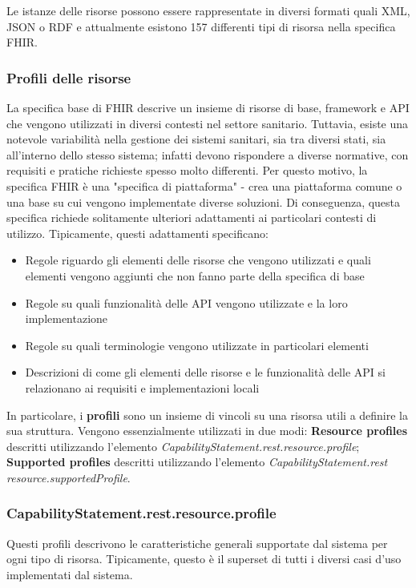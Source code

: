 \documentclass[a4paper]{article}
\begin{document}
Le istanze delle risorse possono essere rappresentate in diversi formati quali XML, JSON o RDF e attualmente esistono 157 differenti tipi di risorsa nella specifica FHIR.

\subsubsection*{Profili delle risorse}
La specifica base di FHIR descrive un insieme di risorse di base, framework e API che vengono utilizzati in diversi contesti nel settore sanitario. Tuttavia, esiste una notevole variabilità nella gestione dei sistemi sanitari, sia tra diversi stati, sia all'interno dello stesso sistema; infatti devono rispondere a diverse normative, con requisiti e pratiche richieste spesso molto differenti.
Per questo motivo, la specifica FHIR è una "specifica di piattaforma" - crea una piattaforma comune o una base su cui vengono implementate diverse soluzioni. Di conseguenza, questa specifica richiede solitamente ulteriori adattamenti ai particolari contesti di utilizzo. Tipicamente, questi adattamenti specificano:
\begin{itemize}
    \item Regole riguardo gli elementi delle risorse che vengono utilizzati e quali elementi vengono aggiunti che non fanno parte della specifica di base
    \item Regole su quali funzionalità delle API vengono utilizzate e la loro implementazione
    \item Regole su quali terminologie vengono utilizzate in particolari elementi
    \item Descrizioni di come gli elementi delle risorse e le funzionalità delle API si  relazionano ai requisiti e implementazioni locali
\end{itemize}
In particolare, i \textbf{profili} sono un insieme di vincoli su una risorsa utili a definire la sua struttura.
Vengono essenzialmente utilizzati in due modi:
\textbf{Resource profiles} descritti utilizzando l'elemento \textit{CapabilityStatement.rest.resource.profile};
\textbf{Supported profiles} descritti utilizzando l'elemento \textit{CapabilityStatement.rest resource.supportedProfile}.
\subsubsection*{CapabilityStatement.rest.resource.profile}
Questi profili descrivono le caratteristiche generali supportate dal sistema per ogni tipo di risorsa.
Tipicamente, questo è il superset di tutti i diversi casi d'uso implementati dal sistema.
\end{document}

